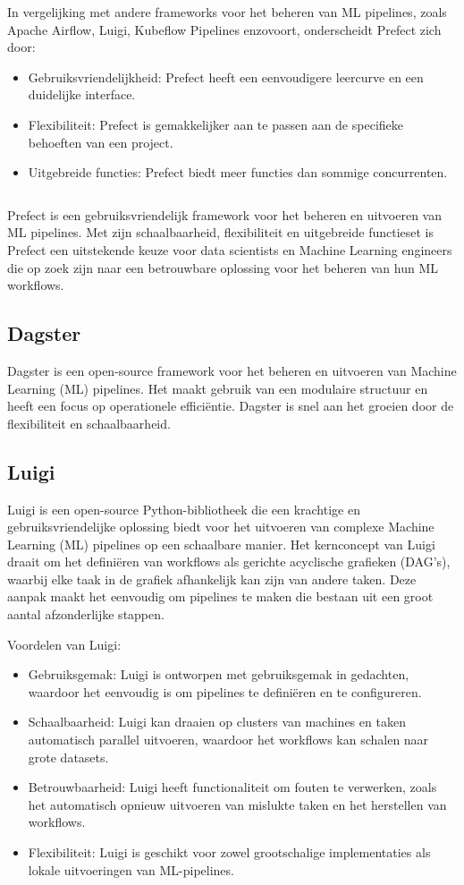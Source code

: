 In vergelijking met andere frameworks voor het beheren van ML pipelines, zoals Apache Airflow, Luigi, Kubeflow Pipelines enzovoort, onderscheidt Prefect zich door:

\begin{itemize}
  \item Gebruiksvriendelijkheid: Prefect heeft een eenvoudigere leercurve en een duidelijke interface.
  \item Flexibiliteit: Prefect is gemakkelijker aan te passen aan de specifieke behoeften van een project.
  \item Uitgebreide functies: Prefect biedt meer functies dan sommige concurrenten.
\end{itemize}
\begin{verbatim}
\end{verbatim}
Prefect is een gebruiksvriendelijk framework voor het beheren en uitvoeren van ML pipelines. Met zijn schaalbaarheid, flexibiliteit en uitgebreide functieset is Prefect een uitstekende keuze voor data scientists en Machine Learning engineers die op zoek zijn naar een betrouwbare oplossing voor het beheren van hun ML workflows.
\subsection{Dagster}
Dagster is een open-source framework voor het beheren en uitvoeren van Machine Learning (ML) pipelines. Het maakt gebruik van een modulaire structuur en heeft een focus op operationele efficiëntie. Dagster is snel aan het groeien door de flexibiliteit en schaalbaarheid.


\subsection{Luigi}

Luigi is een open-source Python-bibliotheek die een krachtige en gebruiksvriendelijke oplossing biedt voor het uitvoeren van complexe Machine Learning (ML) pipelines op een schaalbare manier. Het kernconcept van Luigi draait om het definiëren van workflows als gerichte acyclische grafieken (DAG's), waarbij elke taak in de grafiek afhankelijk kan zijn van andere taken. Deze aanpak maakt het eenvoudig om pipelines te maken die bestaan uit een groot aantal afzonderlijke stappen.

Voordelen van Luigi:
\begin{itemize}
  \item Gebruiksgemak: Luigi is ontworpen met gebruiksgemak in gedachten, waardoor het eenvoudig is om pipelines te definiëren en te configureren.
  \item Schaalbaarheid: Luigi kan draaien op clusters van machines en taken automatisch parallel uitvoeren, waardoor het workflows kan schalen naar grote datasets.
  \item Betrouwbaarheid: Luigi heeft functionaliteit om fouten te verwerken, zoals het automatisch opnieuw uitvoeren van mislukte taken en het herstellen van workflows.
  \item Flexibiliteit: Luigi is geschikt voor zowel grootschalige implementaties als lokale uitvoeringen van ML-pipelines.
\end{itemize}

